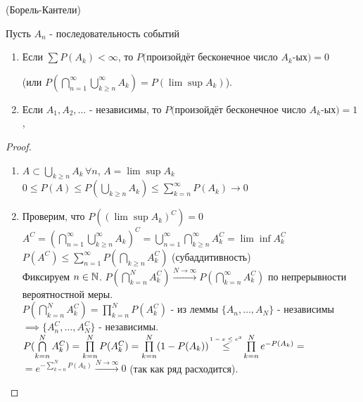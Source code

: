 \begin{lemma}\label{lect04:lemma3} (Борель-Кантели)
	
	Пусть $A_n$ - последовательность событий
	\begin{enumerate} 
		\item Если $\sum P(A_k) < \infty$, то $P($произойдёт бесконечное число $A_k$-ых$) = 0$ 
		
		(или $P( \bigcap \limits_{n=1}^{\infty} \bigcup \limits_{k \geq n}^{\infty} A_k) = P(\lim \sup A_k)$).
		\item Если $A_1, A_2, \dots$ - независимы, то $P($произойдёт бесконечное число $A_k$-ых$) = 1$,
	\end{enumerate}
\end{lemma}        
\begin{proof}
	\begin{enumerate} 
		\item $A \subset \bigcup \limits_{k \geq n} A_k \, \forall n$, $A = \lim \sup A_k$\\
		$0 \leq P(A) \leq P(\bigcup \limits_{k \geq n} A_k) \leq \sum \limits_{k=n}^{\infty} P(A_k) \to 0$
		\item Проверим, что $P((\lim \sup A_k)^C) = 0$\\
		$A^C = (\bigcap \limits_{n=1}^{\infty} \bigcup \limits_{k \geq n}^{\infty} A_k)^C = \bigcup \limits_{n=1}^{\infty} \bigcap \limits_{k \geq n}^{\infty} A_k^C = \lim \inf A_k^C$\\
		$P(A^C) \leq \sum \limits_{n=1}^{\infty}P(\bigcap \limits_{k \geq n} A_k^C)$ (субаддитивность)\\
		Фиксируем $n \in \mathbb{N}$. $P(\bigcap \limits_{k=n}^N A_k^C) \xrightarrow{N \to \infty} P(\bigcap \limits_{k=n}^{\infty} A_k^C)$ по непрерывности вероятностной меры.\\
		$P(\bigcap \limits_{k=n}^N A_k^C) = \prod \limits_{k=n}^N P(A_k^C)$ - из леммы $\{A_n, \dots, A_N\}$ - независимы $\implies \{A_n^C, \dots, A_N^C\}$ - независимы.\\
		$P(\bigcap \limits_{k=n}^N A_k^C) = \prod \limits_{k=n}^N P(A_k^C) = \prod \limits_{k=n}^N (1-P(A_k)) \overset{\makebox[30pt]{\mbox{\normalfont\tiny $1-x \leq e^x$}}}{\leq}  \prod \limits_{k=n}^N e^{-P(A_k)}=$\\
		$ = e^{-\sum \limits_{k=n}^N P(A_k)}  \xrightarrow{N \to \infty} 0$ (так как ряд расходится).
	\end{enumerate}
\end{proof}